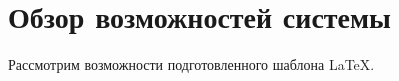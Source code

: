 \chapter{Обзор возможностей системы}\label{ch:chapter_1}

Рассмотрим возможности подготовленного шаблона \LaTeX.